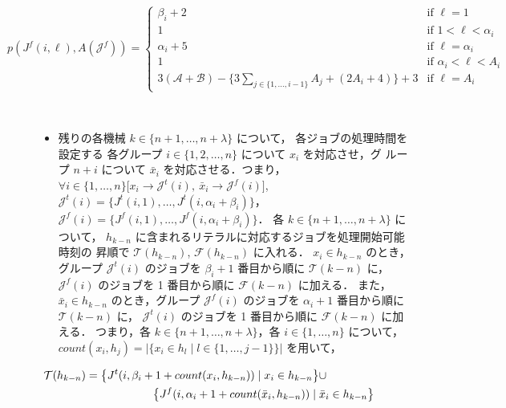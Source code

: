 \documentclass[12pt]{optlab-bachelor}
\begin{document}
\begin{displaymath}
  p(J^f(i,\ell),A(\mathcal{J}^f)) = \left\{ \begin{array}{lllll}
  \beta_i + 2 & \text{if } \ell = 1 \\
  1 & \text{if } 1 < \ell < \alpha_i \\ \alpha_i
  + 5 & \text{if } \ell = \alpha_i  \\ 1 & \text{if } \alpha_i < \ell < A_i \\ 3(\mathcal{A} + \mathcal{B}) -
  \big\{ 3\!\!\!\!\!\displaystyle \sum_{j \in \{1,\ldots,i - 1\}}\!\!\!\!\!A_j
  + (2A_i + 4)\big \} + 3 & \text{if }
  \ell = A_i \end{array} \right.
\end{displaymath}

\begin{description}
  \item[] ~
  \begin{itemize}
    \item 残りの各機械 $k \in \{n + 1, \ldots , n + \lambda\}$ について，
    各ジョブの処理時間を設定する
    各グループ $i \in \{1,2,\ldots,n\}$ について $x_i$ を対応させ，グ
    ループ $n + i$ について $\bar x_i$ を対応させる．つまり，$\forall
    i \in \{1,\ldots,n\}\big[x_i \to \mathcal{J}^t(i),\ \bar x_i \to
    \mathcal{J}^f(i) \big]$,
    $\mathcal{J}^t(i) = \big\{J^t(i,1),\ldots,J^t(i,\alpha_i +
    \beta_i)\big\}$，$\mathcal{J}^f(i) =
    \big\{J^f(i,1),\ldots,J^f(i,\alpha_i + \beta_i)\big\}$．
    各 $k \in \{n + 1, \ldots , n + \lambda\}$ について，
    $h_{k - n}$ に含まれるリテラルに対応するジョブを処理開始可能時刻の
    昇順で $\mathcal{T}(h_{k - n})$, $\mathcal{F}(h_{k - n})$ に入れる．
    $x_i \in h_{k - n}$ のとき，グループ $\mathcal{J}^t(i)$ のジョブを
    $\beta_i + 1$ 番目から順に $\mathcal{T}(k - n)$ に，
    $\mathcal{J}^f(i)$ のジョブを 1 番目から順に $\mathcal{F}(k - n)$ に加える．
    また，$\bar x_i \in h_{k - n}$ のとき，グループ $\mathcal{J}^f(i)$
    のジョブを $\alpha_i + 1$ 番目から順に $\mathcal{T}(k - n)$ に，
    $\mathcal{J}^t(i)$ のジョブを 1 番目から順に $\mathcal{F}(k - n)$ に加える．
    つまり，各 $k \in \{n + 1, \ldots,n + \lambda\}$，各 $i \in \{1,\ldots,n\}$
    について，$count(x_i,h_j) = \big|\big\{x_i \in h_l \mid l \in \{1,\ldots,j -
    1\}\big\}\big|$ を用いて，
  \end{itemize}
\end{description}
\begin{equation}
  \begin{split}
    \mathcal{T}(h_{k - n}) &= \big\{J^t(i,\beta_i + 1 +
    count(x_i,h_{k - n})) \mid x_i \in h_{k - n}\big\} \cup \\ &\qquad \qquad\qquad \big\{J^f(i,\alpha_i + 1 + count(\bar x_i, h_{k - n})) \mid \bar x_i \in h_{k - n}\big\} \notag
  \end{split}
\end{equation}
\end{document}
